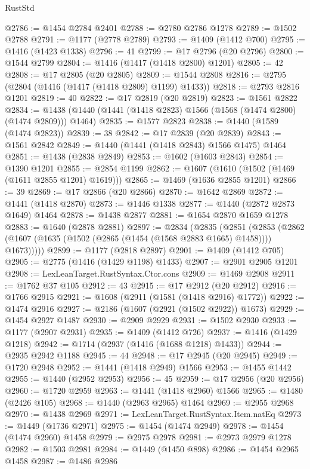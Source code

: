 \begin{lexlean}{RustStd}
\begin{coremodule}
{\begin{coremodule}
{{{{{{{{{{{{{{{{{{{{{{{{{{{{{{{@2786 := @1454 @2784 @2401
@2788 := @2780 @2786 @1278
@2789 := @1502 @2788
@2791 := @1177 (@2778 @2789)
@2793 := @1409 (@1412 @700)
@2795 := @1416 (@1423 @1338)
@2796 := 41
@2799 := @17 @2796 (@20 @2796)
@2800 := @1544 @2799
@2804 := @1416 (@1417 (@1418 @2800) @1201)
@2805 := 42
@2808 := @17 @2805 (@20 @2805)
@2809 := @1544 @2808
@2816 := @2795 (@2804 (@1416 (@1417 (@1418 @2809) @1199) @1433))
@2818 := @2793 @2816 @1201
@2819 := 40
@2822 := @17 @2819 (@20 @2819)
@2823 := @1561 @2822
@2834 := @1438 (@1440 (@1441 (@1418 @2823) @1566 (@1568 (@1474 @2800) (@1474 @2809))) @1464)
@2835 := @1577 @2823
@2838 := @1440 (@1589 (@1474 @2823))
@2839 := 38
@2842 := @17 @2839 (@20 @2839)
@2843 := @1561 @2842
@2849 := @1440 (@1441 (@1418 @2843) @1566 @1475) @1464
@2851 := @1438 (@2838 @2849)
@2853 := @1602 (@1603 @2843)
@2854 := @1390 @1201
@2855 := @2854 @1199
@2862 := @1607 (@1610 (@1502 (@1469 (@1611 @2855 @1201) @1619)))
@2865 := @1469 (@1636 @2855 @1201)
@2866 := 39
@2869 := @17 @2866 (@20 @2866)
@2870 := @1642 @2869
@2872 := @1441 (@1418 @2870)
@2873 := @1446 @1338
@2877 := @1440 (@2872 @2873 @1649) @1464
@2878 := @1438 @2877
@2881 := @1654 @2870 @1659 @1278
@2883 := @1640 (@2878 @2881)
@2897 := @2834
    (@2835
      (@2851
        (@2853 (@2862 (@1607 (@1635 (@1502 (@2865 (@1454 (@1568 @2883 @1665) @1458)))) @1673)))))
@2899 := @1177 (@2818 @2897)
@2901 := @1409 (@1412 @705)
@2905 := @2775 (@1416 (@1429 @1198) @1433)
@2907 := @2901 @2905 @1201
@2908 := LexLeanTarget.RustSyntax.Ctor.cons
@2909 := @1469 @2908
@2911 := @1762 @37 @105
@2912 := 43
@2915 := @17 @2912 (@20 @2912)
@2916 := @1766 @2915
@2921 := @1608 (@2911 (@1581 (@1418 @2916) @1772))
@2922 := @1474 @2916
@2927 := @2186 (@1607 (@2921 (@1502 @2922)) @1673)
@2929 := @1454 @2927 @1487
@2930 := @2909 @2929
@2931 := @1502 @2930
@2933 := @1177 (@2907 @2931)
@2935 := @1409 (@1412 @726)
@2937 := @1416 (@1429 @1218)
@2942 := @1714 (@2937 (@1416 (@1688 @1218) @1433))
@2944 := @2935 @2942 @1188
@2945 := 44
@2948 := @17 @2945 (@20 @2945)
@2949 := @1720 @2948
@2952 := @1441 (@1418 @2949) @1566
@2953 := @1455 @1442
@2955 := @1440 (@2952 @2953)
@2956 := 45
@2959 := @17 @2956 (@20 @2956)
@2960 := @1720 @2959
@2963 := @1441 (@1418 @2960) @1566
@2965 := @1480 (@2426 @105)
@2968 := @1440 (@2963 @2965) @1464
@2969 := @2955 @2968
@2970 := @1438 @2969
@2971 := LexLeanTarget.RustSyntax.Item.natEq
@2973 := @1449 (@1736 @2971)
@2975 := @1454 (@1474 @2949)
@2978 := @1454 (@1474 @2960) @1458
@2979 := @2975 @2978
@2981 := @2973 @2979 @1278
@2982 := @1503 @2981
@2984 := @1449 (@1450 @898)
@2986 := @1454 @2965 @1458
@2987 := @1486 @2986
}}}}}}}}}}}}}}}}}}}}}}}}}}}}}}}
\end{coremodule}}
\end{coremodule}
\end{lexlean}
